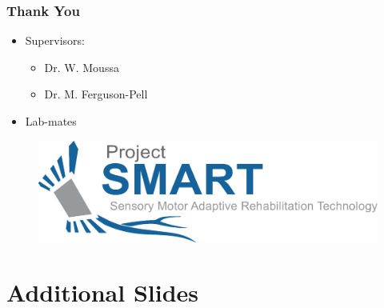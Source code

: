 \documentclass{beamer}
\begin{document}
		\begin{frame}
			\frametitle{Thank You}
			\begin{itemize}
				\item Supervisors:
				\begin{itemize}
					\item Dr. W. Moussa
					\item Dr. M. Ferguson-Pell
				\end{itemize}
				\item Lab-mates
			\end{itemize}
			\begin{figure}
				\includegraphics[width=\textwidth]{assets/SMART.eps}
			\end{figure}
		\end{frame}

	\AtBeginSection{}
	\appendix
	\section{Additional Slides}
	\setcounter{showProgressBar}{0}
	\setcounter{showSlideNumbers}{0}
\end{document}
